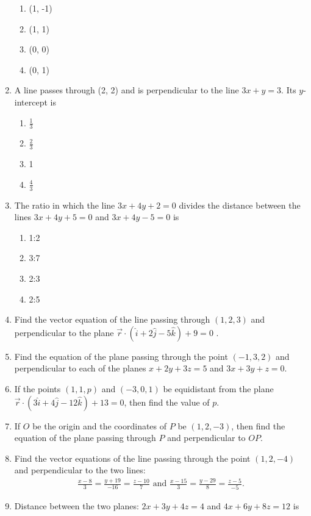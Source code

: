 \begin{enumerate}[label=\thesubsection.\arabic*, ref=\thesubsection.\theenumi]
\begin{enumerate}
\item (1, -1)
\item (1, 1)
\item (0, 0)
\item (0, 1)
\end{enumerate}
\item A line passes through (2, 2) and is perpendicular to the line $3x+y=3$. Its $y$-intercept is 
\begin{enumerate}
\item $\frac{1}{3}$
\item $\frac{2}{3}$
\item 1
\item $\frac{4}{3}$
\end{enumerate}
\item The ratio in which the line $3x+4y+2=0$ divides the distance between the lines $3x+4y+5=0$ and $3x+4y-5=0$ is
\begin{enumerate}
\item 1:2
\item 3:7
\item 2:3
\item 2:5
\end{enumerate}
\item Find the vector equation of the line passing through $(1, 2, 3)$ and perpendicular to the plane $\overrightarrow{r}\cdot(\hat{i}+2\hat{j}-5\hat{k})+9=0$ .
\item Find the equation of the plane passing through the point $(-1, 3, 2)$ and perpendicular to each of the planes $x+2y+3z=5$ and $3x+3y+z=0$.
\item If the points $(1, 1, p)$ and $(-3, 0, 1)$ be equidistant from the plane $\overrightarrow{r}\cdot(3\hat{i}+4\hat{j}-12\hat{k})+13=0$,  then find the value of $p$.
\item If $O$ be the origin and the coordinates of $P$ be $(1, 2, -3)$,  then find the equation of the plane passing through $P$ and perpendicular to $OP$.
\item Find the vector equations of the line passing through the point $(1, 2, -4)$ and perpendicular to the two lines:
\begin{align}
\frac{x-8}{3}=\frac{y+19}{-16}=\frac{z-10}{7}\text{ and } \frac{x-15}{3}=\frac{y-29}{8}=\frac{z-5}{-5}.
\end{align}
\item Distance between the two planes: $2x+3y+4z=4$ and $4x+6y+8z=12$ is \label{prob:22}
\begin{enumerate}

\end{enumerate}
\end{enumerate}
